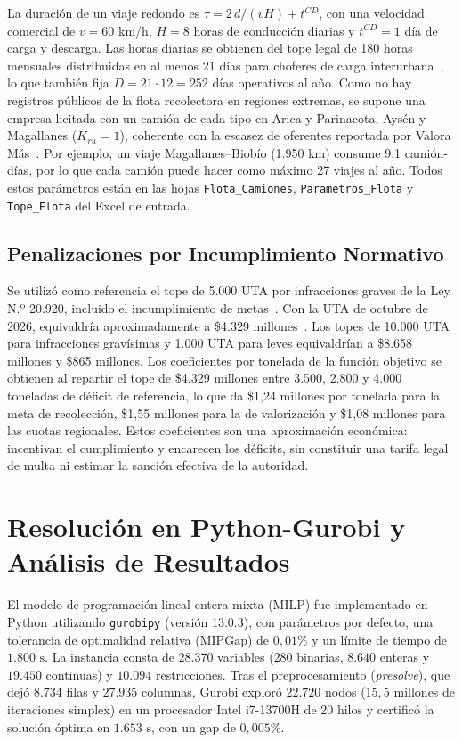 \documentclass[letterpaper]{article}
\begin{document}
La duración de un viaje redondo es $\tau = 2\,d/(vH) + t^{CD}$, con una velocidad comercial de $v=60$ km/h, $H=8$ horas de conducción diarias y $t^{CD}=1$ día de carga y descarga. Las horas diarias se obtienen del tope legal de 180 horas mensuales distribuidas en al menos 21 días para choferes de carga interurbana~\cite{dt2025}, lo que también fija $D = 21\cdot 12 = 252$ días operativos al año. Como no hay registros públicos de la flota recolectora en regiones extremas, se supone una empresa licitada con un camión de cada tipo en Arica y Parinacota, Aysén y Magallanes ($K_{ru}=1$), coherente con la escasez de oferentes reportada por Valora Más~\cite{paiscircular2026}. Por ejemplo, un viaje Magallanes--Biobío (1.950 km) consume 9,1 camión-días, por lo que cada camión puede hacer como máximo 27 viajes al año. Todos estos parámetros están en las hojas \texttt{Flota\_Camiones}, \texttt{Parametros\_Flota} y \texttt{Tope\_Flota} del Excel de entrada.

\subsection{Penalizaciones por Incumplimiento Normativo}

Se utilizó como referencia el tope de 5.000 UTA por infracciones graves de la Ley N.º 20.920, incluido el incumplimiento de metas~\cite{leyrep20920}. Con la UTA de octubre de 2026, equivaldría aproximadamente a \$4.329 millones~\cite{sii2026}. Los topes de 10.000 UTA para infracciones gravísimas y 1.000 UTA para leves equivaldrían a \$8.658 millones y \$865 millones. Los coeficientes por tonelada de la función objetivo se obtienen al repartir el tope de \$4.329 millones entre 3.500, 2.800 y 4.000 toneladas de déficit de referencia, lo que da \$1,24 millones por tonelada para la meta de recolección, \$1,55 millones para la de valorización y \$1,08 millones para las cuotas regionales. Estos coeficientes son una aproximación económica: incentivan el cumplimiento y encarecen los déficits, sin constituir una tarifa legal de multa ni estimar la sanción efectiva de la autoridad.


\section{Resolución en Python-Gurobi y Análisis de Resultados}

El modelo de programación lineal entera mixta (MILP) fue implementado en Python utilizando \texttt{gurobipy} (versión 13.0.3), con parámetros por defecto, una tolerancia de optimalidad relativa ($\text{MIPGap}$) de $0,01\%$ y un límite de tiempo de $1.800\text{ s}$. La instancia consta de $28.370$ variables ($280$ binarias, $8.640$ enteras y $19.450$ continuas) y $10.094$ restricciones. Tras el preprocesamiento (\textit{presolve}), que dejó $8.734$ filas y $27.935$ columnas, Gurobi exploró $22.720$ nodos ($15,5$ millones de iteraciones simplex) en un procesador Intel i7-13700H de 20 hilos y certificó la solución óptima en $1.653\text{ s}$, con un gap de $0,005\%$.
\end{document}
